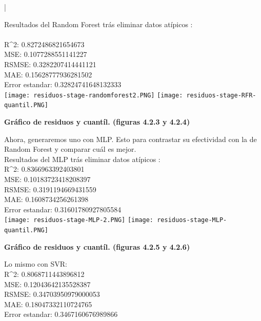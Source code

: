 |\documentclass{article}
\begin{document}
Resultados del Random Forest trás eliminar datos atípicos
:\\
    \\
    {R^2}:  0.8272486821654673\\
    MSE:  0.1077288551141227\\
    RSMSE:  0.3282207414441121\\
    MAE:  0.15628777936281502\\
    Error estandar:  0.32824741648132333\\
    
        \texttt{[image: residuos-stage-randomforest2.PNG]} 
        \texttt{[image: residuos-stage-RFR-quantil.PNG]} \\
        \begin{center}
            \textbf{Gráfico de residuos y cuantíl. (figuras 4.2.3 y 4.2.4)}
        \end{center}

Ahora, generaremos uno con MLP. Esto para contrastar su efectividad con la de Random Forest y comparar cuál es mejor.\\

Resultados del MLP trás eliminar datos atípicos
:\\

        {R^2}:  0.8366963392403801\\
        MSE:  0.10183723418208397\\
        RSMSE:  0.3191194669431559\\
        MAE:  0.1608734256261398\\
        Error estandar:  0.31601780927805584\\

        \texttt{[image: residuos-stage-MLP-2.PNG]} 
        \texttt{[image: residuos-stage-MLP-quantil.PNG]} \\
                \begin{center}
            \textbf{Gráfico de residuos y cuantíl. (figuras 4.2.5 y 4.2.6)}
        \end{center}


Lo mismo con SVR:\\

        {R^2}:  0.8068711443896812\\
        MSE:  0.12043642135528387\\
        RSMSE:  0.34703950979000053\\
        MAE:  0.18047332110724765\\
        Error estandar:  0.3467160676989866\\
\end{document}
